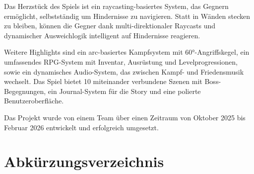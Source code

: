 \documentclass[
  a4paper,
  11pt,
  ngerman,
  parskip=half,
  bibliography=totoc,
  listof=totoc
]{scrreprt}
\begin{document}
Das Herzstück des Spiels ist ein raycasting-basiertes System, das Gegnern ermöglicht, selbstständig um Hindernisse zu navigieren. Statt in Wänden stecken zu bleiben, können die Gegner dank multi-direktionaler Raycasts und dynamischer Ausweichlogik intelligent auf Hindernisse reagieren.

Weitere Highlights sind ein arc-basiertes Kampfsystem mit 60°-Angriffskegel, ein umfassendes RPG-System mit Inventar, Ausrüstung und Levelprogressionen, sowie ein dynamisches Audio-System, das zwischen Kampf- und Friedensmusik wechselt. Das Spiel bietet 10 miteinander verbundene Szenen mit Boss-Begegnungen, ein Journal-System für die Story und eine polierte Benutzeroberfläche.

Das Projekt wurde von einem Team über einen Zeitraum von Oktober 2025 bis Februar 2026 entwickelt und erfolgreich umgesetzt.

\newpage


\tableofcontents


\listoffigures


\listoftables


\chapter*{Abkürzungsverzeichnis}

\begin{acronym}
\end{acronym}
\end{document}
